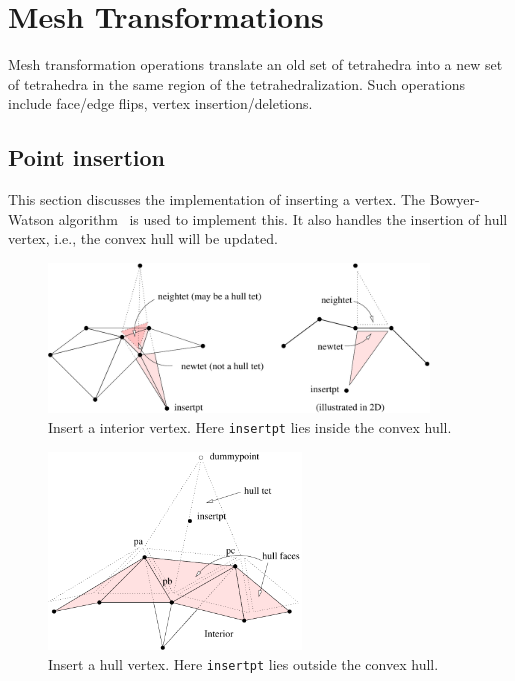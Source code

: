 \chapter{Mesh Transformations}

Mesh transformation operations translate an old set of tetrahedra into a new set of tetrahedra in the same region of the tetrahedralization. Such operations include face/edge flips, vertex insertion/deletions.

\section{Point insertion}

This section discusses the implementation of inserting a vertex. The Bowyer-Watson algorithm~\cite{Bowyer81, Watson81} is used to implement this. It also handles the insertion of hull vertex, i.e., the convex hull will be updated.

\begin{figure}
  \centering
  \includegraphics[width=0.9\textwidth]{../figs/bowyerwatson1}
\caption{Insert a interior vertex. Here {\tt insertpt} lies inside the convex hull.}
\label{fig:bowyerwatson1}
\end{figure}

\begin{figure}
  \centering
  \includegraphics[width=0.6\textwidth]{../figs/inserthullvertex}
\caption{Insert a hull vertex. Here {\tt insertpt} lies outside the convex hull. }
\label{fig:inserthullvertex}
\end{figure}

